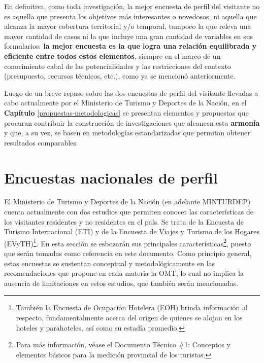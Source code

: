 \documentclass[
]{book}
\begin{document}
En definitiva, como toda investigación, la mejor encuesta de perfil del visitante no es aquella que presenta los objetivos más interesantes o novedosos, ni aquella que alcanza la mayor cobertura territorial y/o temporal, tampoco la que releva una mayor cantidad de casos ni la que incluye una gran cantidad de variables en sus formularios: \textbf{la mejor encuesta es la que logra una relación equilibrada y eficiente entre todos estos elementos}, siempre en el marco de un conocimiento cabal de las potencialidades y las restricciones del contexto (presupuesto, recursos técnicos, etc.), como ya se mencionó anteriormente.

Luego de un breve repaso sobre las dos encuestas de perfil del visitante llevadas a cabo actualmente por el Ministerio de Turismo y Deportes de la Nación, en el \textbf{Capítulo} \ref{propuestas-metodologicas} se presentan elementos y propuestas que procuran contribuir la construcción de investigaciones que alcancen esta \textbf{armonía} y que, a su vez, se basen en metodologías estandarizadas que permitan obtener resultados comparables.

\hypertarget{encuestas-nacionales-de-perfil}{%
\chapter{\texorpdfstring{\textbf{Encuestas nacionales de perfil}}{Encuestas nacionales de perfil}}\label{encuestas-nacionales-de-perfil}}

El Ministerio de Turismo y Deportes de la Nación (en adelante MINTURDEP) cuenta actualmente con dos estudios que permiten conocer las características de los visitantes residentes y no residentes en el país. Se trata de la Encuesta de Turismo Internacional (ETI) y de la Encuesta de Viajes y Turismo de los Hogares (EVyTH)\footnote{También la Encuesta de Ocupación Hotelera (EOH) brinda información al respecto, fundamentalmente acerca del origen de quienes se alojan en los hoteles y parahoteles, así como su estadía promedio.}. En esta sección se esbozarán sus principales características\footnote{Para más información, véase el Documento Técnico \#1: Conceptos y elementos básicos para la medición provincial de los turistas.}, puesto que serán tomadas como referencia en este documento. Como principio general, estas encuestas se sustentan conceptual y metodológicamente en las recomendaciones que propone en cada materia la OMT, lo cual no implica la ausencia de limitaciones en estos estudios, que también serán mencionadas.
\end{document}
